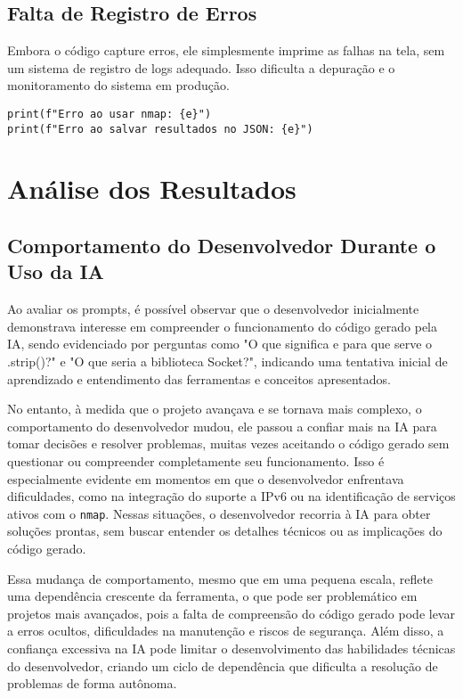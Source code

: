 \documentclass[12pt]{article}
\begin{document}
\subsection{Falta de Registro de Erros}

Embora o código capture erros, ele simplesmente imprime as falhas na tela, sem um sistema de registro de logs adequado. Isso dificulta a depuração e o monitoramento do sistema em produção.

\begin{lstlisting}
print(f"Erro ao usar nmap: {e}")
print(f"Erro ao salvar resultados no JSON: {e}")
\end{lstlisting}


\section{Análise dos Resultados}

\subsection{Comportamento do Desenvolvedor Durante o Uso da IA}

Ao avaliar os prompts, é possível observar que o desenvolvedor inicialmente demonstrava interesse em compreender o funcionamento do código gerado pela IA, sendo evidenciado por perguntas como "O que significa e para que serve o .strip()?" e "O que seria a biblioteca Socket?", indicando uma tentativa inicial de aprendizado e entendimento das ferramentas e conceitos apresentados.

No entanto, à medida que o projeto avançava e se tornava mais complexo, o comportamento do desenvolvedor mudou, ele passou a confiar mais na IA para tomar decisões e resolver problemas, muitas vezes aceitando o código gerado sem questionar ou compreender completamente seu funcionamento. Isso é especialmente evidente em momentos em que o desenvolvedor enfrentava dificuldades, como na integração do suporte a IPv6 ou na identificação de serviços ativos com o \texttt{nmap}. Nessas situações, o desenvolvedor recorria à IA para obter soluções prontas, sem buscar entender os detalhes técnicos ou as implicações do código gerado.

Essa mudança de comportamento, mesmo que em uma pequena escala, reflete uma dependência crescente da ferramenta, o que pode ser problemático em projetos mais avançados, pois a falta de compreensão do código gerado pode levar a erros ocultos, dificuldades na manutenção e riscos de segurança. Além disso, a confiança excessiva na IA pode limitar o desenvolvimento das habilidades técnicas do desenvolvedor, criando um ciclo de dependência que dificulta a resolução de problemas de forma autônoma.
\end{document}
